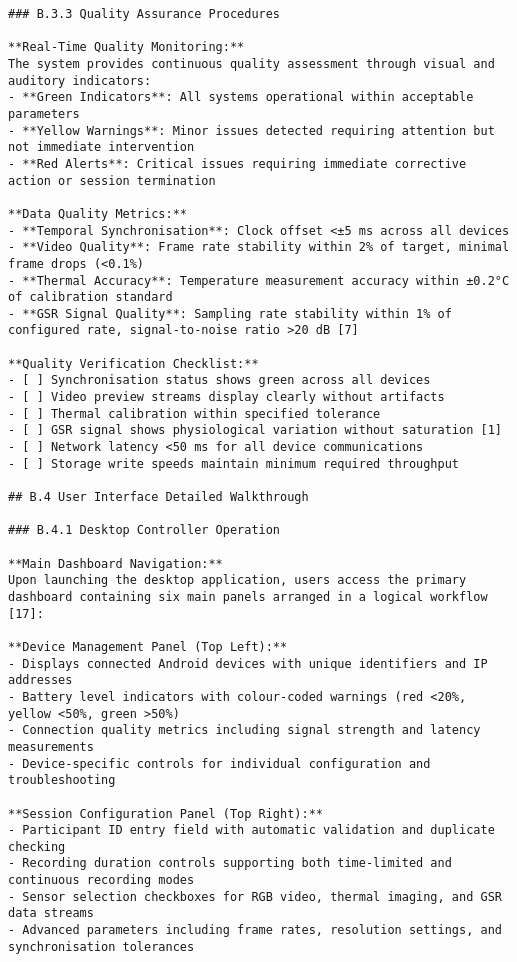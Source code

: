 \begin{verbatim}
### B.3.3 Quality Assurance Procedures

**Real-Time Quality Monitoring:**
The system provides continuous quality assessment through visual and auditory indicators:
- **Green Indicators**: All systems operational within acceptable parameters
- **Yellow Warnings**: Minor issues detected requiring attention but not immediate intervention
- **Red Alerts**: Critical issues requiring immediate corrective action or session termination

**Data Quality Metrics:**
- **Temporal Synchronisation**: Clock offset <±5 ms across all devices
- **Video Quality**: Frame rate stability within 2% of target, minimal frame drops (<0.1%)
- **Thermal Accuracy**: Temperature measurement accuracy within ±0.2°C of calibration standard
- **GSR Signal Quality**: Sampling rate stability within 1% of configured rate, signal-to-noise ratio >20 dB [7]

**Quality Verification Checklist:**
- [ ] Synchronisation status shows green across all devices
- [ ] Video preview streams display clearly without artifacts
- [ ] Thermal calibration within specified tolerance
- [ ] GSR signal shows physiological variation without saturation [1]
- [ ] Network latency <50 ms for all device communications
- [ ] Storage write speeds maintain minimum required throughput

## B.4 User Interface Detailed Walkthrough

### B.4.1 Desktop Controller Operation

**Main Dashboard Navigation:**
Upon launching the desktop application, users access the primary dashboard containing six main panels arranged in a logical workflow [17]:

**Device Management Panel (Top Left):**
- Displays connected Android devices with unique identifiers and IP addresses
- Battery level indicators with colour-coded warnings (red <20%, yellow <50%, green >50%)
- Connection quality metrics including signal strength and latency measurements
- Device-specific controls for individual configuration and troubleshooting

**Session Configuration Panel (Top Right):**
- Participant ID entry field with automatic validation and duplicate checking
- Recording duration controls supporting both time-limited and continuous recording modes
- Sensor selection checkboxes for RGB video, thermal imaging, and GSR data streams
- Advanced parameters including frame rates, resolution settings, and synchronisation tolerances


\end{verbatim}
